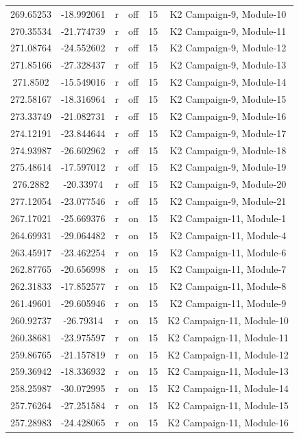 \documentclass[11pt]{article}
\begin{document}
\begin{center}
\begin{longtable}{|c|c|c|c|c|c|}
269.65253 & -18.992061 & r & off &15 & K2 Campaign-9, Module-10\\
270.35534 & -21.774739 & r & off &15 & K2 Campaign-9, Module-11\\
271.08764 & -24.552602 & r & off &15 & K2 Campaign-9, Module-12\\
271.85166 & -27.328437 & r & off &15 & K2 Campaign-9, Module-13\\
271.8502 & -15.549016 & r & off &15 & K2 Campaign-9, Module-14\\
272.58167 & -18.316964 & r & off &15 & K2 Campaign-9, Module-15\\
273.33749 & -21.082731 & r & off &15 & K2 Campaign-9, Module-16\\
274.12191 & -23.844644 & r & off &15 & K2 Campaign-9, Module-17\\
274.93987 & -26.602962 & r & off &15 & K2 Campaign-9, Module-18\\
275.48614 & -17.597012 & r & off &15 & K2 Campaign-9, Module-19\\
276.2882 & -20.33974 & r & off &15 & K2 Campaign-9, Module-20\\
277.12054 & -23.077546 & r & off &15 & K2 Campaign-9, Module-21\\
267.17021 & -25.669376 & r & on &15 & K2 Campaign-11, Module-1\\
264.69931 & -29.064482 & r & on &15 & K2 Campaign-11, Module-4\\
263.45917 & -23.462254 & r & on &15 & K2 Campaign-11, Module-6\\
262.87765 & -20.656998 & r & on &15 & K2 Campaign-11, Module-7\\
262.31833 & -17.852577 & r & on &15 & K2 Campaign-11, Module-8\\
261.49601 & -29.605946 & r & on &15 & K2 Campaign-11, Module-9\\
260.92737 & -26.79314 & r & on &15 & K2 Campaign-11, Module-10\\
260.38681 & -23.975597 & r & on &15 & K2 Campaign-11, Module-11\\
259.86765 & -21.157819 & r & on &15 & K2 Campaign-11, Module-12\\
259.36942 & -18.336932 & r & on &15 & K2 Campaign-11, Module-13\\
258.25987 & -30.072995 & r & on &15 & K2 Campaign-11, Module-14\\
257.76264 & -27.251584 & r & on &15 & K2 Campaign-11, Module-15\\
257.28983 & -24.428065 & r & on &15 & K2 Campaign-11, Module-16\\

\end{longtable}
\end{center}
\end{document}
